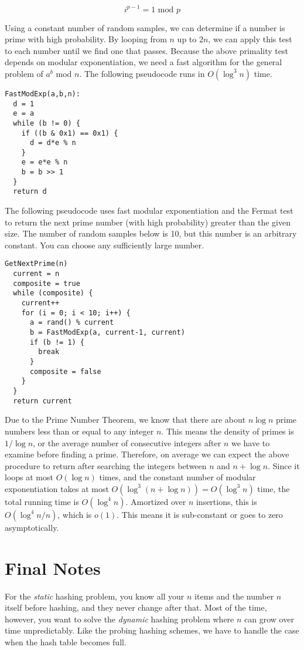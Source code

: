 \documentclass{article}[10pth]
\begin{document}
\begin{equation}
i^{p-1} = 1 \textrm{ mod } p
\end{equation}

Using a constant number of random samples, we can determine if a number
is prime with high probability. By looping from $n$ up to $2n$, we can
apply this test to each number until we find one that passes.
Because the above primality test depends on modular exponentiation,
we need a fast algorithm for the general problem of $a^b$ mod $n$.
The following pseudocode runs in $O(\log^3{n})$ time.

\begin{verbatim}
FastModExp(a,b,n):
  d = 1
  e = a
  while (b != 0) {
    if ((b & 0x1) == 0x1) {
      d = d*e % n
    }
    e = e*e % n
    b = b >> 1
  }
  return d
\end{verbatim}

The following pseudocode uses fast modular exponentiation and the
Fermat test to return the next prime number (with high probability)
greater than the given size. The number of random samples below is 10,
but this number is an arbitrary constant. You can choose any sufficiently
large number.

\begin{verbatim}
GetNextPrime(n)
  current = n
  composite = true
  while (composite) {
    current++
    for (i = 0; i < 10; i++) {
      a = rand() % current
      b = FastModExp(a, current-1, current)
      if (b != 1) {
        break
      }
      composite = false
    }
  }
  return current
\end{verbatim}

Due to the Prime Number Theorem, we know that there are about $n \log n$
prime numbers less than or equal to any integer $n$. This means the
density of primes is $1/\log n$, or the average number of consecutive integers
after $n$ we have to examine before finding a prime.
Therefore, on average we can expect the above procedure to
return after searching
the integers between $n$ and $n+\log{n}$.
Since it loops at most $O(\log{n})$ times,
and the constant number of modular exponentiation takes at most
$O(\log^3{(n+\log{n})}) = O(\log^3{n})$ time, the total running time is
$O(\log^4{n})$. Amortized over $n$ insertions, this is
$O(\log^4{n}/n)$, which is $o(1)$.
This means it is sub-constant or goes to zero asymptotically.

\section{Final Notes}
For the \textit{static} hashing problem, you know all your $n$ items and the
number $n$ itself before hashing, and they never change after that.
Most of the time, however, you want to solve the \textit{dynamic}
hashing problem where $n$ can grow over time unpredictably. Like the
probing hashing schemes, we have to handle the case when the hash table
becomes full.
\end{document}
